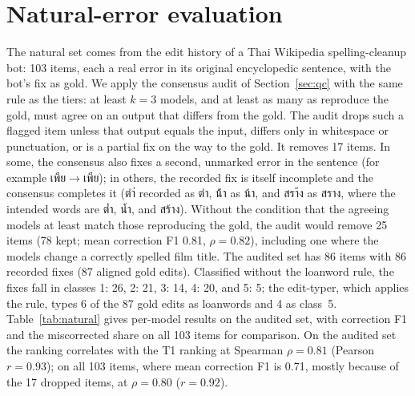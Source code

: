 \documentclass[11pt]{article}
\begin{document}
\section{Natural-error evaluation}
\label{app:natural}
The natural set comes from the edit history of a Thai Wikipedia spelling-cleanup bot: 103 items, each a
real error in its original encyclopedic sentence, with the bot's fix as gold. We apply the consensus
audit of Section~\ref{sec:qc} with the same rule as the tiers: at least $k = 3$ models, and at
least as many as reproduce the gold, must agree on an output that differs from the gold. The audit
drops such a flagged item unless that output equals the input, differs only in whitespace or punctuation, or is a partial fix on the way
to the gold. It removes 17 items. In some, the consensus also fixes a second, unmarked error in the
sentence (for example เพึย$\to$เพีย); in others, the recorded fix is itself incomplete and the
consensus completes it (ตำ่ recorded as ตำ, น้้า as น้า, and สรา้ง as สราง, where the intended words
are ต่ำ, น้ำ, and สร้าง). Without the condition that the agreeing models at least match those reproducing the gold, the
audit would remove 25 items
(78 kept; mean correction F1 0.81, $\rho = 0.82$), including one where the models change a
correctly spelled film title. The audited set has 86 items with 86 recorded fixes (87 aligned gold edits). Classified without
the loanword rule, the fixes fall in classes 1: 26, 2: 21, 3: 14, 4: 20, and 5: 5; the edit-typer,
which applies the rule, types 6 of the 87 gold edits as loanwords and 4 as class~5. Table~\ref{tab:natural} gives per-model results on the audited
set, with correction F1 and the miscorrected share on all 103 items for comparison. On the audited
set the ranking correlates with the T1 ranking at Spearman $\rho = 0.81$ (Pearson $r = 0.93$); on
all 103 items, where mean correction F1 is 0.71, mostly because of the 17 dropped items, at
$\rho = 0.80$ ($r = 0.92$).
\end{document}
